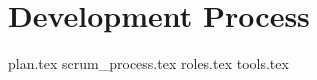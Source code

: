 \chapter{Development Process}
\label{chap:process}

{plan.tex}
{scrum_process.tex}
{roles.tex}
{tools.tex}
